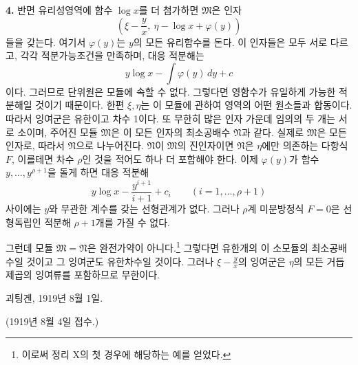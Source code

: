 \textbf{4.} 반면 유리성영역에 함수 \(\log x\)를 더 첨가하면 \(\mathfrak M\)은 인자
\[
 \left(\xi-\frac{y}{x},\ \eta-\log x+\varphi(y)\right)
\]
들을 갖는다. 여기서 \(\varphi(y)\)는 \(y\)의 모든 유리함수를 돈다. 이 인자들은 모두 서로 다르고, 각각 적분가능조건을 만족하며, 대응 적분해는
\[
 y\log x-\int\varphi(y)\,dy+c
\]
이다. 그러므로 단위원은 모듈에 속할 수 없다. 그렇다면 영함수가 유일하게 가능한 적분해일 것이기 때문이다. 한편 \(\xi,\eta\)는 이 모듈에 관하여 영역의 어떤 원소들과 합동이다. 따라서 잉여군은 유한이고 차수 1이다. 또 무한히 많은 인자 가운데 임의의 두 개는 서로 소이며, 주어진 모듈 \(\mathfrak M\)은 이 모든 인자의 최소공배수 \(\mathfrak N\)과 같다. 실제로 \(\mathfrak M\)은 모든 인자로, 따라서 \(\mathfrak N\)으로 나누어진다. \(\mathfrak N\)이 \(\mathfrak M\)의 진인자이면 \(\mathfrak N\)은 \(\eta\)에만 의존하는 다항식 \(F\), 이를테면 차수 \(\rho\)인 것을 적어도 하나 더 포함해야 한다. 이제 \(\varphi(y)\)가 함수 \(y,\ldots,y^{\rho+1}\)을 돌게 하면 대응 적분해
\[
 y\log x-\frac{y^{i+1}}{i+1}+c_i
 \qquad(i=1,\ldots,\rho+1)
\]
사이에는 \(y\)와 무관한 계수를 갖는 선형관계가 없다. 그러나 \(\rho\)계 미분방정식 \(F=0\)은 선형독립인 적분해 \(\rho+1\)개를 가질 수 없다.

그런데 모듈 \(\mathfrak M=\mathfrak N\)은 완전가약이 아니다.\footnote{이로써 정리 X의 첫 경우에 해당하는 예를 얻었다.} 그렇다면 유한개의 이 소모듈의 최소공배수일 것이고 그 잉여군도 유한차수일 것이다. 그러나 \(\xi-\frac yx\)의 잉여군은 \(\eta\)의 모든 거듭제곱의 잉여류를 포함하므로 무한이다.

괴팅겐, 1919년 8월 1일.

\begin{center}
(1919년 8월 4일 접수.)
\end{center}

\endgroup

\clearpage
